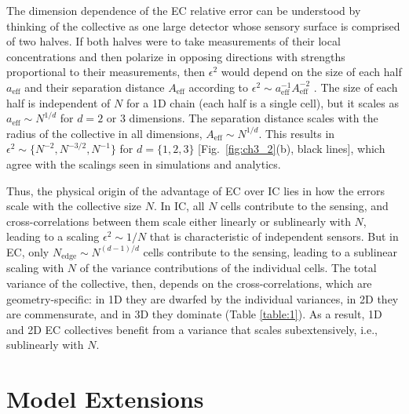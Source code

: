 The dimension dependence of the EC relative error can be understood by thinking of the collective as one large detector whose sensory surface is comprised of two halves. If both halves were to take measurements of their local concentrations and then polarize in opposing directions with strengths proportional to their measurements, then $\epsilon^2$ would depend on the size of each half
$a_\text{eff}$
and their separation distance
$A_\text{eff}$ according to $\epsilon^2  \sim a^{-1}_\text{eff}A^{-2}_\text{eff}$ \cite{mugler2016limits}.
The size of each half is independent of $N$ for a 1D chain (each half is a single cell), but it scales as
$a_\text{eff} \sim N^{1/d}$ for $d = 2$ or $3$ dimensions.
The separation distance scales with the radius of the collective in all dimensions,
$A_\text{eff} \sim N^{1/d}$. This results in
$\epsilon^2 \sim \{N^{-2}, N^{-3/2}, N^{-1}\}$ for $d=\{1,2,3\}$ [Fig.\ \ref{fig:ch3_2}(b), black lines],
which agree with the scalings seen in simulations and analytics.

Thus, the physical origin of the advantage of EC over IC lies in how the errors scale with the collective size $N$. In IC, all $N$ cells contribute to the sensing, and cross-correlations between them scale either linearly or sublinearly with $N$, leading to a scaling $\epsilon^2 \sim 1/N$ that is characteristic of independent sensors. But in EC, only $N_\text{edge} \sim N^{(d-1)/d}$ cells contribute to the sensing, leading to a sublinear scaling with $N$ of the variance contributions of the individual cells. The total variance of the collective, then, depends on the cross-correlations, which are geometry-specific: in 1D they are dwarfed by the individual variances, in 2D they are commensurate, and in 3D they dominate (Table \ref{table:1}). As a result, 1D and 2D EC collectives benefit from a variance that scales subextensively, i.e., sublinearly with $N$.

\section{Model Extensions}

